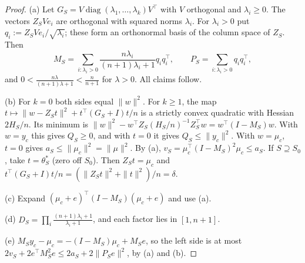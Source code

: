 \documentclass[11pt]{article}
\theoremstyle{remark}
\begin{document}
\begin{proof}
(a) Let $G_S=V\operatorname{diag}(\lambda_1,\dots,\lambda_k)V^\top$ with $V$ orthogonal and $\lambda_i\ge0$. The vectors $Z_SVe_i$ are orthogonal with squared norms $\lambda_i$. For $\lambda_i>0$ put $q_i:=Z_SVe_i/\sqrt{\lambda_i}$; these form an orthonormal basis of the column space of $Z_S$. Then
\[
M_S=\sum_{i:\lambda_i>0}\frac{n\lambda_i}{(n+1)\lambda_i+1}q_iq_i^\top,\qquad P_S=\sum_{i:\lambda_i>0}q_iq_i^\top,
\]
and $0<\frac{n\lambda}{(n+1)\lambda+1}<\frac n{n+1}$ for $\lambda>0$. All claims follow.

(b) For $k=0$ both sides equal $\|w\|^2$. For $k\ge1$, the map $t\mapsto\|w-Z_St\|^2+t^\top(G_S+I)t/n$ is a strictly convex quadratic with Hessian $2H_S/n$. Its minimum is $\|w\|^2-w^\top Z_S(H_S/n)^{-1}Z_S^\top w=w^\top(I-M_S)w$. With $w=y_c$ this gives $Q_S\ge0$, and with $t=0$ it gives $Q_S\le\|y_c\|^2$. With $w=\mu_c$, $t=0$ gives $a_S\le\|\mu_c\|^2=\|\mu\|^2$. By (a), $v_S=\mu_c^\top(I-M_S)^2\mu_c\le a_S$. If $S\supseteq S_0$, take $t=\theta^\ast_S$ (zero off $S_0$). Then $Z_St=\mu_c$ and $t^\top(G_S+I)t/n=(\|Z_St\|^2+\|t\|^2)/n=\delta$.

(c) Expand $(\mu_c+e)^\top(I-M_S)(\mu_c+e)$ and use (a).

(d) $D_S=\prod_i\frac{(n+1)\lambda_i+1}{\lambda_i+1}$, and each factor lies in $[1,n+1]$.

(e) $M_Sy_c-\mu_c=-(I-M_S)\mu_c+M_Se$, so the left side is at most $2v_S+2e^\top M_S^2e\le2a_S+2\|P_Se\|^2$, by (a) and (b).


\end{proof}
\end{document}
